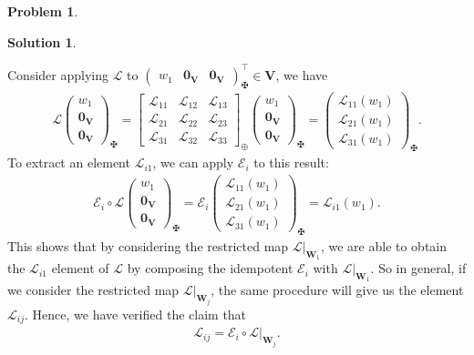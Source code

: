 \documentclass{article}
\theoremstyle{definition}
\newtheorem*{prob*}{Problem}
\newtheorem*{sln*}{Solution}
\newcommand{\V}{\mathbf{V}}
\newcommand{\W}{\mathbf{W}}
\newcommand{\lag}{\mathcal{L}}
\newcommand{\E}{\mathcal{E}}
\begin{document}
\begin{prob*}
\begin{sln*}
\begin{enumerate}
			Consider applying $\lag$ to $\begin{pmatrix}
			w_1 & \mathbf{0}_\V & \mathbf{0}_\V
			\end{pmatrix}^\top_\maltese \in \V$, we have
			\begin{align*}
			\lag\begin{pmatrix}
			w_1 \\ \mathbf{0}_\V \\ \mathbf{0}_\V
			\end{pmatrix}_\maltese = \begin{bmatrix}
			\lag_{11} & \lag_{12} & \lag_{13}\\
			\lag_{21} & \lag_{22} & \lag_{23}\\
			\lag_{31} & \lag_{32} & \lag_{33}
			\end{bmatrix}_\oplus
			\begin{pmatrix}
			w_1 \\ \mathbf{0}_\V \\ \mathbf{0}_\V
			\end{pmatrix}_\maltese
			=
			\begin{pmatrix}
			\lag_{11}(w_1)\\
			\lag_{21}(w_1)\\
			\lag_{31}(w_1)
			\end{pmatrix}_\maltese.
			\end{align*}
			To extract an element $\lag_{i1}$, we can apply $\E_i$ to this result:
			\begin{align*}
			\E_i \circ \lag \begin{pmatrix}
			w_1 \\ \mathbf{0}_\V \\ \mathbf{0}_\V
			\end{pmatrix}_\maltese = \E_i \begin{pmatrix}
			\lag_{11}(w_1)\\
			\lag_{21}(w_1)\\
			\lag_{31}(w_1)
			\end{pmatrix}_\maltese = \lag_{i1}(w_1).
			\end{align*}
			This shows that by considering the restricted map $\lag\bigg\vert_{\W_1}$, we are able to obtain the $\lag_{{i1}}$ element of $\lag$ by composing the idempotent $\E_i$ with $\lag\bigg\vert_{\W_1}$. So in general, if we consider the restricted map $\lag\bigg\vert_{\W_j}$, the same procedure will give us the element $\lag_{ij}$.  Hence, we have verified the claim that
			\begin{align*}
			\lag_{{ij}} = \E_i \circ \lag\bigg\vert_{\W_j}.
			\end{align*}
			

\end{enumerate}
\end{sln*}
\end{prob*}
\end{document}
